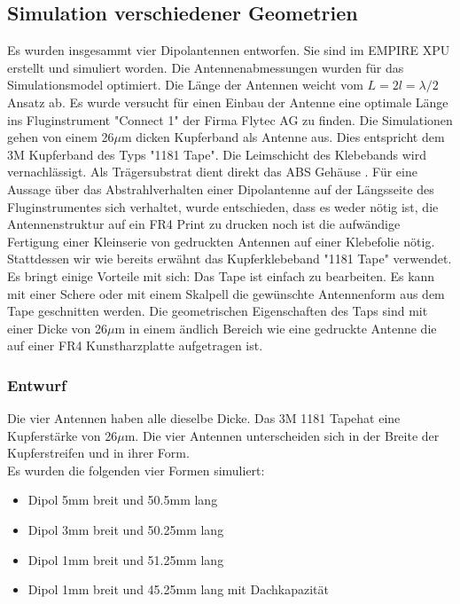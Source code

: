 \subsection{Simulation  verschiedener Geometrien}\label{sec:Sim_verschiedene_Geometrien}
Es wurden insgesammt vier Dipolantennen entworfen. Sie sind im EMPIRE XPU erstellt und simuliert worden. Die Antennenabmessungen wurden für das Simulationsmodel optimiert. Die Länge der Antennen weicht vom $L=2l=\lambda/2$ Ansatz ab. Es wurde versucht für einen Einbau der Antenne eine optimale Länge  ins Fluginstrument "Connect 1" der Firma Flytec AG zu finden. Die Simulationen gehen von einem 26$\mu$m dicken Kupferband als Antenne aus. Dies entspricht dem 3M Kupferband des Typs "1181 Tape". Die Leimschicht des Klebebands wird vernachlässigt. Als Trägersubstrat dient direkt das ABS Gehäuse \cite{Kupferband}. Für eine Aussage über das Abstrahlverhalten einer Dipolantenne auf der Längsseite des Fluginstrumentes sich verhaltet, wurde entschieden, dass es weder nötig ist, die Antennenstruktur auf ein FR4 Print zu drucken noch ist die aufwändige Fertigung einer Kleinserie von gedruckten Antennen auf einer Klebefolie nötig. Stattdessen wir wie bereits erwähnt das Kupferklebeband "1181 Tape" verwendet. Es bringt einige Vorteile mit sich: Das Tape ist einfach zu bearbeiten. Es kann mit einer Schere oder mit einem Skalpell die gewünschte Antennenform aus dem Tape geschnitten werden. Die geometrischen Eigenschaften des Taps sind mit einer Dicke von 26$\mu$m in einem ändlich Bereich wie eine gedruckte Antenne die auf einer FR4 Kunstharzplatte aufgetragen ist.
\newpage
\subsubsection*{Entwurf}
Die vier Antennen haben alle dieselbe Dicke. Das \glqq 3M 1181 Tape\grqq hat eine Kupferstärke von 26$\mu$m. Die vier Antennen unterscheiden sich in der Breite der Kupferstreifen und in ihrer Form.\\
Es wurden die folgenden vier Formen simuliert:

\begin{itemize}
\item Dipol 5mm breit und 50.5mm lang
\item Dipol 3mm breit und 50.25mm lang
\item Dipol 1mm breit und 51.25mm lang
\item Dipol 1mm breit und 45.25mm lang mit Dachkapazität
\end{itemize}

